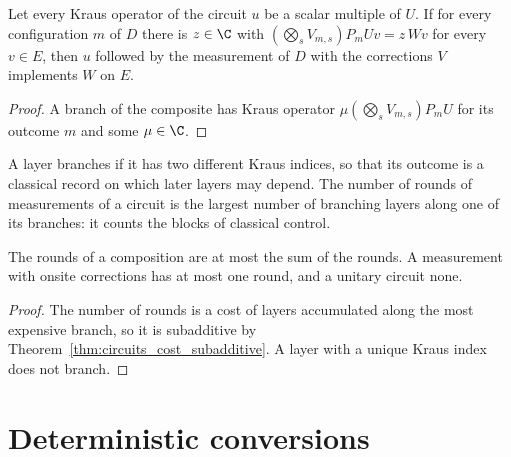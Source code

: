 \begin{lemma}
    \label{lem:measurement_round_implementation}
    \leanok
    Let every Kraus operator of the circuit $u$ be a scalar multiple of $U$. If for every
    configuration $m$ of $D$
    there is $z\in\C$ with $(\bigotimes_sV_{m,s})P_mUv=z\,Wv$ for every $v\in E$, then $u$
    followed by the measurement of $D$ with the corrections $V$ implements $W$ on $E$.
\end{lemma}
\begin{proof}
    \leanok
    A branch of the composite has Kraus operator $\mu(\bigotimes_sV_{m,s})P_mU$ for its outcome
    $m$ and some $\mu\in\C$.
\end{proof}

\begin{definition}
    \label{def:measurement_rounds}
    \leanok
    A layer branches if it has two different Kraus indices, so that its outcome is a classical
    record on which later layers may depend. The number of rounds of measurements of a circuit
    is the largest number of branching layers along one of its branches: it counts the blocks
    of classical control.
\end{definition}

\begin{lemma}
    \label{lem:measurement_rounds}
    \leanok
    The rounds of a composition are at most the sum of the rounds. A measurement with onsite
    corrections has at most one round, and a unitary circuit none.
\end{lemma}
\begin{proof}
    \leanok
    The number of rounds is a cost of layers accumulated along the most expensive branch, so
    it is subadditive by Theorem~\ref{thm:circuits_cost_subadditive}. A layer with a unique
    Kraus index does not branch.
\end{proof}

\section{Deterministic conversions}
\label{sec:measurement_conversion}

